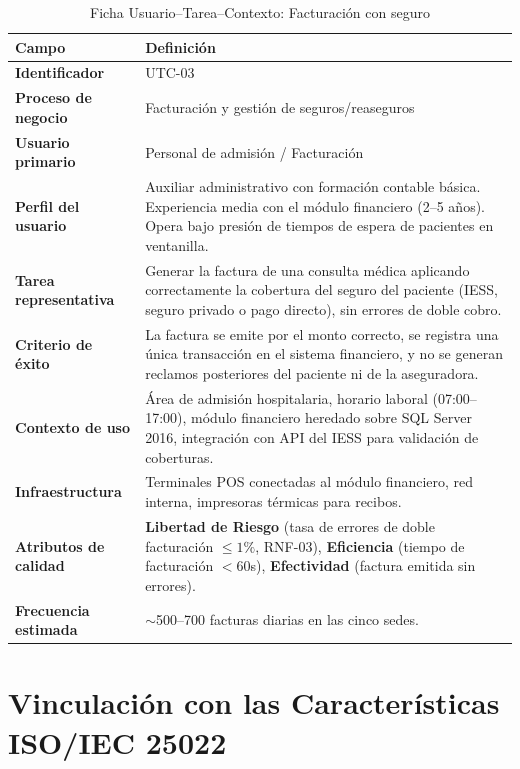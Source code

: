 \documentclass[12pt,a4paper]{article}
\begin{document}
\begin{table}[H]
\centering
\caption{Ficha Usuario--Tarea--Contexto: Facturaci\'on con seguro}
\begin{tabularx}{\textwidth}{l X}
\toprule
\textbf{Campo} & \textbf{Definici\'on} \\
\midrule
\textbf{Identificador} & UTC-03 \\
\textbf{Proceso de negocio} & Facturaci\'on y gesti\'on de seguros/reaseguros \\
\textbf{Usuario primario} & Personal de admisi\'on / Facturaci\'on \\
\textbf{Perfil del usuario} & Auxiliar administrativo con formaci\'on contable b\'asica. Experiencia media con el m\'odulo financiero (2--5 a\~nos). Opera bajo presi\'on de tiempos de espera de pacientes en ventanilla. \\
\textbf{Tarea representativa} & Generar la factura de una consulta m\'edica aplicando correctamente la cobertura del seguro del paciente (IESS, seguro privado o pago directo), sin errores de doble cobro. \\
\textbf{Criterio de \'exito} & La factura se emite por el monto correcto, se registra una \'unica transacci\'on en el sistema financiero, y no se generan reclamos posteriores del paciente ni de la aseguradora. \\
\textbf{Contexto de uso} & \'Area de admisi\'on hospitalaria, horario laboral (07:00--17:00), m\'odulo financiero heredado sobre SQL Server 2016, integraci\'on con API del IESS para validaci\'on de coberturas. \\
\textbf{Infraestructura} & Terminales POS conectadas al m\'odulo financiero, red interna, impresoras t\'ermicas para recibos. \\
\textbf{Atributos de calidad} & \textbf{Libertad de Riesgo} (tasa de errores de doble facturaci\'on $\le 1\%$, RNF-03), \textbf{Eficiencia} (tiempo de facturaci\'on $<60$s), \textbf{Efectividad} (factura emitida sin errores). \\
\textbf{Frecuencia estimada} & $\sim$500--700 facturas diarias en las cinco sedes. \\
\bottomrule
\end{tabularx}
\end{table}

\section{Vinculaci\'on con las Caracter\'isticas ISO/IEC 25022}
\end{document}
